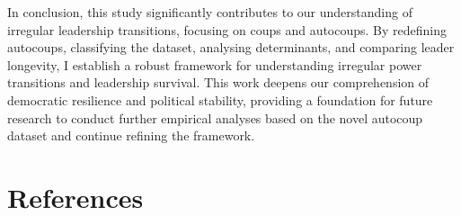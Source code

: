 \documentclass[
  12pt,
]{report}
\begin{document}
In conclusion, this study significantly contributes to our understanding
of irregular leadership transitions, focusing on coups and autocoups. By
redefining autocoups, classifying the dataset, analysing determinants,
and comparing leader longevity, I establish a robust framework for
understanding irregular power transitions and leadership survival. This
work deepens our comprehension of democratic resilience and political
stability, providing a foundation for future research to conduct further
empirical analyses based on the novel autocoup dataset and continue
refining the framework.

\chapter*{References}\label{references}
\end{document}
